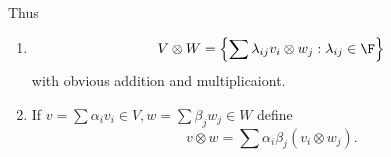 \documentclass[a4paper]{article}
\begin{document}
Thus
\begin{enumerate}
\item
  \[
    V \otimes W = \left\{\sum \lambda_{ij} v_i \otimes w_j: \lambda_{ij} \in \F \right\}
  \]
  with obvious addition and multiplicaiont.
\item If \(v = \sum \alpha_i v_i \in V, w = \sum \beta_j w_j \in W\) define
  \[
    v \otimes w = \sum \alpha_i \beta_j (v_i \otimes w_j).
  \]
\end{enumerate}







\printindex
\end{document}
